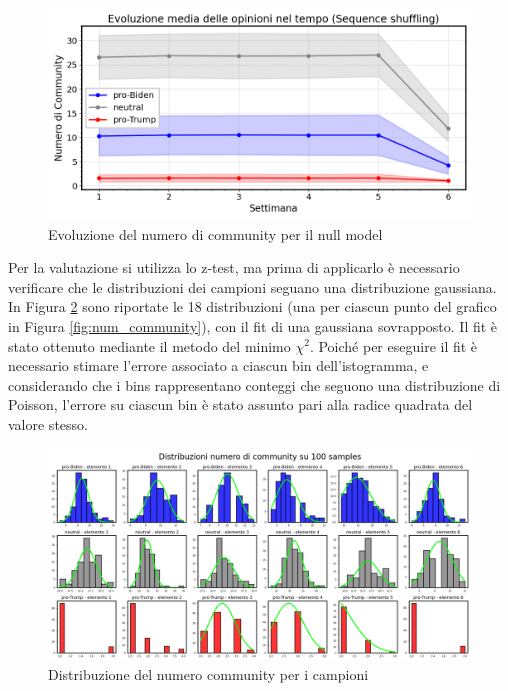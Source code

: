 \documentclass[sigchi]{acmart}
\begin{document}
\begin{figure}[h]
    \centering
    \includegraphics[width=\linewidth]{img/Sequence_shuffling.png}
    \caption{Evoluzione del numero di community per il null model} \label{fig:null_model}
\end{figure}

Per la valutazione si utilizza lo z-test, ma prima di applicarlo è necessario verificare che le distribuzioni dei campioni seguano una distribuzione gaussiana. In Figura \ref{fig:samples_dist} sono riportate le 18 distribuzioni (una per ciascun punto del grafico in Figura \ref{fig:num_community}), con il fit di una gaussiana sovrapposto. Il fit è stato ottenuto mediante il metodo del minimo $\chi^2$. Poiché per eseguire il fit è necessario stimare l'errore associato a ciascun bin dell'istogramma, e considerando che i bins rappresentano conteggi che seguono una distribuzione di Poisson, l'errore su ciascun bin è stato assunto pari alla radice quadrata del valore stesso.

\begin{figure}[h]
    \centering
    \includegraphics[width=\linewidth]{img/Distribuzione_community_samples.png}
    \caption{Distribuzione del numero community per i campioni} \label{fig:samples_dist}
\end{figure}
\end{document}
